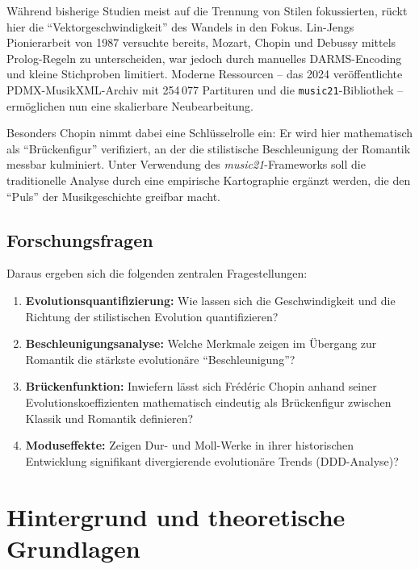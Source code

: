 \documentclass[12pt,a4paper]{article}
\theoremstyle{definition}
\begin{document}
Während bisherige Studien meist auf die Trennung von Stilen fokussierten\autocite[Vgl.][]{LinJeng1987, Simonetta2025}, rückt hier die \enquote{Vektorgeschwindigkeit} des Wandels in den Fokus. Lin-Jengs Pionierarbeit von 1987 versuchte bereits, Mozart, Chopin und Debussy mittels Prolog-Regeln zu unterscheiden, war jedoch durch manuelles DARMS-Encoding und kleine Stichproben limitiert. Moderne Ressourcen -- das 2024 veröffentlichte PDMX-MusikXML-Archiv\autocite{PDMX2024} mit 254\,077 Partituren und die \texttt{music21}-Bibliothek\autocite{Cuthbert2010} -- ermöglichen nun eine skalierbare Neubearbeitung.

Besonders Chopin nimmt dabei eine Schlüsselrolle ein: Er wird hier mathematisch als \enquote{Brückenfigur} verifiziert, an der die stilistische Beschleunigung der Romantik messbar kulminiert. Unter Verwendung des \textit{music21}-Frameworks soll die traditionelle Analyse durch eine empirische Kartographie ergänzt werden, die den \enquote{Puls} der Musikgeschichte greifbar macht.

\subsection{Forschungsfragen}
Daraus ergeben sich die folgenden zentralen Fragestellungen:
\begin{enumerate}
    \item \textbf{Evolutionsquantifizierung:} Wie lassen sich die Geschwindigkeit und die Richtung der stilistischen Evolution quantifizieren?
    
    \item \textbf{Beschleunigungsanalyse:} Welche Merkmale zeigen im Übergang zur Romantik die stärkste evolutionäre \enquote{Beschleunigung}?
    
    \item \textbf{Brückenfunktion:} Inwiefern lässt sich Frédéric Chopin anhand seiner Evolutionskoeffizienten mathematisch eindeutig als Brückenfigur zwischen Klassik und Romantik definieren?
    
    \item \textbf{Moduseffekte:} Zeigen Dur- und Moll-Werke in ihrer historischen Entwicklung signifikant divergierende evolutionäre Trends (DDD-Analyse)?
\end{enumerate}

\section{Hintergrund und theoretische Grundlagen}
\end{document}
